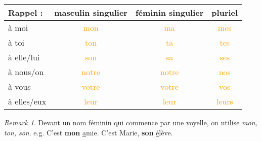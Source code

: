 \documentclass[math,code]{amznotes}
\theoremstyle{remark}
\newtheorem*{remark}{Remark}
\begin{document}
\begin{table}[h]
    \centering
    \renewcommand{\arraystretch}{1.5}
    \begin{tabular}{|l|c|c|c|}
        \hline
        \textbf{Rappel :} & \textbf{masculin singulier} & \textbf{féminin singulier} & \textbf{pluriel} \\
        \hline
        à moi & \textcolor{orange}{mon} & \textcolor{orange}{ma} & \textcolor{orange}{mes} \\
        \hline
        à toi & \textcolor{orange}{ton} & \textcolor{orange}{ta} & \textcolor{orange}{tes} \\
        \hline
        à elle/lui & \textcolor{orange}{son} & \textcolor{orange}{sa} & \textcolor{orange}{ses} \\
        \hline
        à nous/on & \textcolor{orange}{notre} & \textcolor{orange}{notre} & \textcolor{orange}{nos} \\
        \hline
        à vous & \textcolor{orange}{votre} & \textcolor{orange}{votre} & \textcolor{orange}{vos} \\
        \hline
        à elles/eux & \textcolor{orange}{leur} & \textcolor{orange}{leur} & \textcolor{orange}{leurs} \\
        \hline
    \end{tabular}
\end{table}
\begin{notebox}
    \begin{remark}
        Devant un nom féminin qui commence par une voyelle, on utilise \textit{mon, ton, son}. \newline
        e.g. C'est \textbf{mon} \underline{a}mie. C'est Marie, \textbf{son} \underline{é}lève.
    \end{remark}
\end{notebox}
\end{document}
